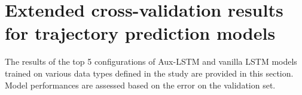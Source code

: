 \chapter{Extended cross-validation results for trajectory prediction models}
\label{A:valT}
The results of the top 5 configurations of Aux-LSTM and vanilla LSTM models trained on various data types defined in the study are provided in this section. Model performances are assessed based on the error on the validation set. 
\begin{table}
\centering
\caption{8-fold cross-validation results for top 5 distance-based Vanilla LSTM models with p=0.3}
\label{tab:dv3}
\end{table}
